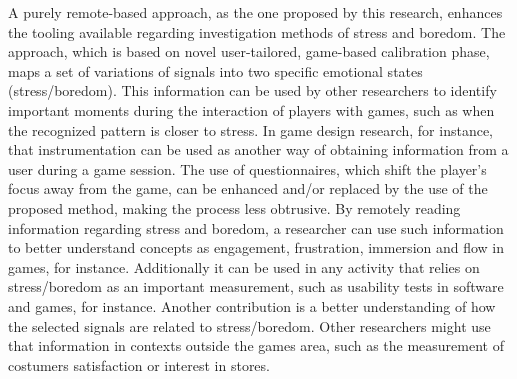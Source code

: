 A purely remote-based approach, as the one proposed by this research, enhances the tooling available regarding investigation methods of stress and boredom. The approach, which is based on novel user-tailored, game-based calibration phase, maps a set of variations of signals into two specific emotional states (stress/boredom). This information can be used by other researchers to identify important moments during the interaction of players with games, such as when the recognized pattern is closer to stress. In game design research, for instance, that instrumentation can be used as another way of obtaining information from a user during a game session. The use of questionnaires, which shift the player's focus away from the game, can be enhanced and/or replaced by the use of the proposed method, making the process less obtrusive. By remotely reading information regarding stress and boredom, a researcher can use such information to better understand concepts as engagement, frustration, immersion and flow in games, for instance. Additionally it can be used in any activity that relies on stress/boredom as an important measurement, such as usability tests in software and games, for instance. Another contribution is a better understanding of how the selected signals are related to stress/boredom. Other researchers might use that information in contexts outside the games area, such as the measurement of costumers satisfaction or interest in stores.


